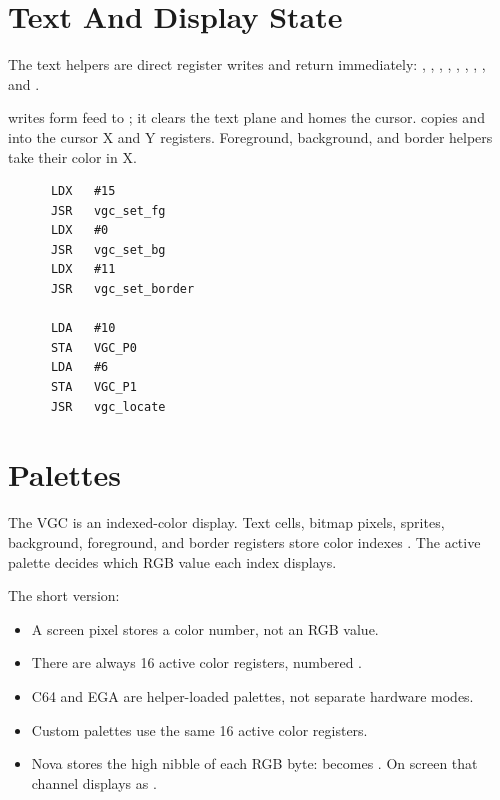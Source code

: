 \section{Text And Display State}

The text helpers are direct register writes and return immediately:
, , ,
, ,
, ,
, and .

 writes form feed to ; it clears the
text plane and homes the cursor.  copies
 and  into the cursor X and Y registers.
Foreground, background, and border helpers take their color in X.

\begin{lstlisting}
      LDX   #15
      JSR   vgc_set_fg
      LDX   #0
      JSR   vgc_set_bg
      LDX   #11
      JSR   vgc_set_border

      LDA   #10
      STA   VGC_P0
      LDA   #6
      STA   VGC_P1
      JSR   vgc_locate
\end{lstlisting}

\section{Palettes}

The VGC is an indexed-color display. Text cells, bitmap pixels, sprites,
background, foreground, and border registers store color indexes
. The active palette decides which RGB value each index
displays.

The short version:

\begin{itemize}
\item A screen pixel stores a color number, not an RGB value.
\item There are always 16 active color registers, numbered .
\item C64 and EGA are helper-loaded palettes, not separate hardware modes.
\item Custom palettes use the same 16 active color registers.
\item Nova stores the high nibble of each RGB byte:  becomes
      . On screen that channel displays as .
\end{itemize}

